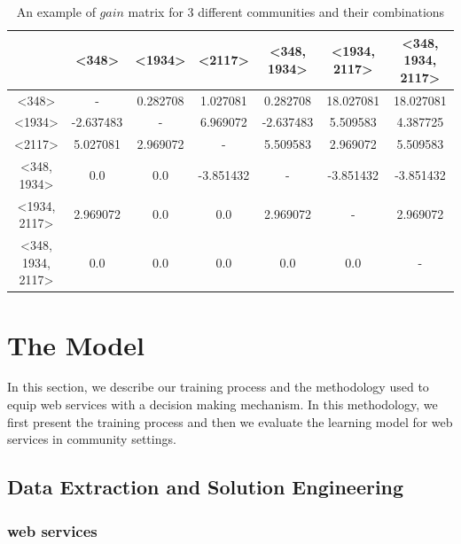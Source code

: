 \documentclass[10pt,journal,cspaper,compsoc]{IEEEtran}
\begin{document}
\begin{table}[ht]
\caption{An example of $gain$ matrix for 3 different communities and their combinations} %
\centering %
{\renewcommand{\arraystretch}{1.2}
\begin{tabular}{c|c c c c c c} %
\hline\hline %
 & \textless348\textgreater & \textless1934\textgreater & \textless2117\textgreater & \textless348, 1934\textgreater & \textless1934, 2117\textgreater & \textless348, 1934, 2117\textgreater \\ [0.5ex] %
\hline %
\textless348\textgreater & - & 0.282708 & 1.027081 & 0.282708 & 18.027081 & 18.027081 \\
\textless1934\textgreater & -2.637483 & - & 6.969072 & -2.637483 & 5.509583 & 4.387725 \\
\textless2117\textgreater & 5.027081 & 2.969072 & - & 5.509583 & 2.969072 & 5.509583 \\
\textless348, 1934\textgreater & 0.0 & 0.0 & -3.851432 & - & -3.851432 & -3.851432 \\
\textless1934, 2117\textgreater & 2.969072 & 0.0 & 0.0 & 2.969072 & - & 2.969072 \\
\textless348, 1934, 2117\textgreater & 0.0 & 0.0 & 0.0 & 0.0 & 0.0 & - \\ [1ex] %
\hline %
\end{tabular}
}
\label{table:nonlin} %
\end{table}

\section{The Model}\label{s:model}

In this section, we describe our training process and the methodology used to equip web services with a decision making mechanism. In this methodology, we first present the training process and then we evaluate the learning model for web services in community settings.

\subsection{Data Extraction and Solution Engineering}\label{ss:learningdata}

\subsubsection{web services}\label{sss:webservices}
\end{document}
